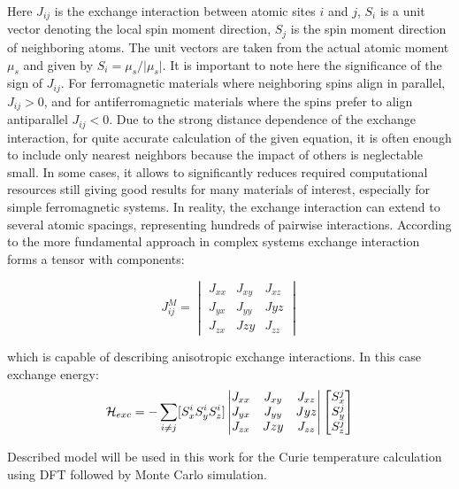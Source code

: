 Here $J_{ij}$ is the exchange interaction between atomic sites $i$ and $j$, $S_i$ is a unit vector denoting the local spin moment direction, $S_j$ is the spin moment direction of neighboring atoms. The unit vectors are taken from the actual atomic moment $\mu_s$ and given by $S_i=\mu_s/\vert\mu_s\vert$.
It is important to note here the significance of the sign of $J_{ij}$. For ferromagnetic materials where neighboring spins align in parallel, $J_{ij} > 0$, and for antiferromagnetic materials where the spins prefer to align antiparallel $J_{ij} < 0$.
Due to the strong distance dependence of the exchange interaction, for quite accurate calculation of the given equation, it is often enough to include only nearest neighbors because the impact of others is neglectable small. In some cases, it allows to significantly reduces required computational resources still giving good results for many materials of interest, especially for simple ferromagnetic systems. In reality, the exchange interaction can extend to several atomic spacings, representing hundreds of pairwise interactions.
According to the more fundamental approach in complex systems exchange interaction forms a tensor with components:

\begin{equation}J_{ij}^M=
\begin{vmatrix}J_{xx} & J_{xy} & J_{xz}\\J_{yx} & J_{yy} & J{yz}\\J_{zx} & J{zy} & J_{zz}\end{vmatrix}
\end{equation}

which is capable of describing anisotropic exchange interactions. In this case exchange energy:
\begin{equation}
{\cal H}_{exc}=-\sum_{i\neq j} [S_x^i S_y^i S_z^i]
\begin{vmatrix}
J_{xx} &J_{xy} & J_{xz}\\
J_{yx} & J_{yy} & J{yz}\\
J_{zx} & J{zy} & J_{zz}
\end{vmatrix}
\begin{bmatrix}
S_{x}^j\\
S_{y}^j\\
S_{z}^j
\end{bmatrix}
\end{equation}

Described model will be used in this work for the Curie temperature calculation using DFT followed by Monte Carlo simulation.